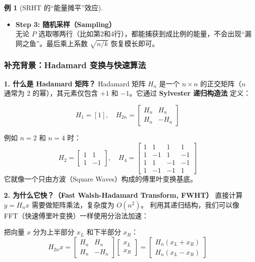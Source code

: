 \documentclass[11pt,a4paper]{ctexart}
\theoremstyle{definition}
\newtheorem{example}[theorem]{例}
\theoremstyle{remark}
\begin{document}
\begin{example}[SRHT 的“能量摊平”效应]
\begin{itemize}
        \item \textbf{Step 3: 随机采样（Sampling）} \\
        无论 $P$ 选取哪两行（比如第2和4行），都能捕获到成比例的能量，不会出现“漏网之鱼”。最后乘上系数 $\sqrt{n/k}$ 恢复模长即可。
    \end{itemize}
\end{example}



\subsubsection*{补充背景：Hadamard 变换与快速算法}

\textbf{1. 什么是 Hadamard 矩阵？}
Hadamard 矩阵 $H_n$ 是一个 $n \times n$ 的正交矩阵（$n$ 通常为 2 的幂），其元素仅包含 $+1$ 和 $-1$。它通过 \textbf{Sylvester 递归构造法} 定义：

\[
H_1 = [1], \quad
H_{2n} = \begin{bmatrix}
H_n & H_n \\
H_n & -H_n
\end{bmatrix}
\]

例如 $n=2$ 和 $n=4$ 时：
\[
H_2 = \begin{bmatrix} 1 & 1 \\ 1 & -1 \end{bmatrix}, \quad
H_4 = \begin{bmatrix}
1 & 1 & 1 & 1 \\
1 & -1 & 1 & -1 \\
1 & 1 & -1 & -1 \\
1 & -1 & -1 & 1
\end{bmatrix}
\]
它就像一个只由方波（Square Waves）构成的傅里叶变换基底。

\textbf{2. 为什么它快？（Fast Walsh-Hadamard Transform, FWHT）}
直接计算 $y = H_n x$ 需要做矩阵乘法，复杂度为 $O(n^2)$。
利用其递归结构，我们可以像 FFT（快速傅里叶变换）一样使用分治法加速：

把向量 $x$ 分为上半部分 $x_L$ 和下半部分 $x_R$：
\[
H_{2n} x = \begin{bmatrix} H_n & H_n \\ H_n & -H_n \end{bmatrix} \begin{bmatrix} x_L \\ x_R \end{bmatrix}
= \begin{bmatrix} H_n (x_L + x_R) \\ H_n (x_L - x_R) \end{bmatrix}
\]
\end{document}
